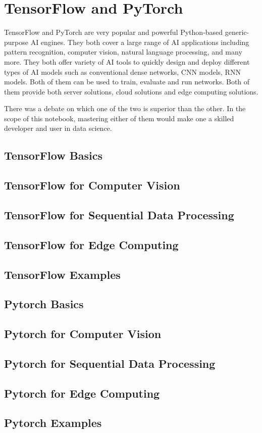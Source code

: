 \chapter{TensorFlow and PyTorch} \label{ch:tf} 

TensorFlow and PyTorch are very popular and powerful Python-based generic-purpose AI engines. They both cover a large range of AI applications including pattern recognition, computer vision, natural language processing, and many more. They both offer variety of AI tools to quickly design and deploy different types of AI models such as conventional dense networks, CNN models, RNN models. Both of them can be used to train, evaluate and run networks. Both of them provide both server solutions, cloud solutions and edge computing solutions.

There was a debate on which one of the two is superior than the other. In the scope of this notebook, mastering either of them would make one a skilled developer and user in data science.

\section{TensorFlow Basics}

\section{TensorFlow for Computer Vision}

\section{TensorFlow for Sequential Data Processing}

\section{TensorFlow for Edge Computing}

\section{TensorFlow Examples}

\section{Pytorch Basics}

\section{Pytorch for Computer Vision}

\section{Pytorch for Sequential Data Processing}

\section{Pytorch for Edge Computing}

\section{Pytorch Examples}